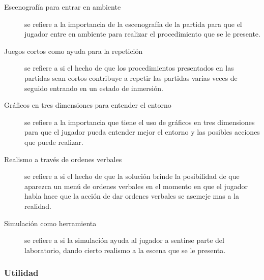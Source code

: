 \begin{description}

\item[Escenografía para entrar en ambiente] se refiere a la importancia de la
    escenografía de la partida para que el jugador entre en ambiente para
    realizar el procedimiento que se le presente.

\item[Juegos cortos como ayuda para la repetición] se refiere a si el hecho de
    que los procedimientos presentados en las partidas sean cortos contribuye a
    repetir las partidas varias veces de seguido entrando en un estado de
    inmersión.

\item[Gráficos en tres dimensiones para entender el entorno] se refiere a la
    importancia que tiene el uso de gráficos en tres dimensiones para que el
    jugador pueda entender mejor el entorno y las posibles acciones que puede
    realizar.

\item[Realismo a través de ordenes verbales] se refiere a si el hecho de que la
    solución brinde la posibilidad de que aparezca un menú de ordenes verbales
    en el momento en que el jugador habla hace que la acción de dar ordenes
    verbales se asemeje mas a la realidad.

\item[Simulación como herramienta] se refiere a si la simulación ayuda al
    jugador a sentirse parte del laboratorio, dando cierto realismo a la escena
    que se le presenta.

\end{description}

\subsubsection{Utilidad}
\label{sec:sub_utilidad}


